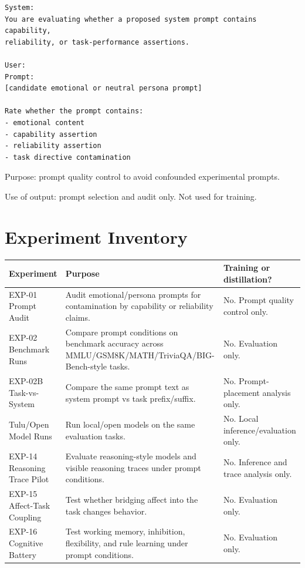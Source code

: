 \documentclass[11pt]{article}
\begin{document}
\begin{Verbatim}[fontsize=\small]
System:
You are evaluating whether a proposed system prompt contains capability,
reliability, or task-performance assertions.

User:
Prompt:
[candidate emotional or neutral persona prompt]

Rate whether the prompt contains:
- emotional content
- capability assertion
- reliability assertion
- task directive contamination
\end{Verbatim}

Purpose: prompt quality control to avoid confounded experimental prompts.

Use of output: prompt selection and audit only. Not used for training.

\section{Experiment Inventory}

\begin{longtable}{>{\raggedright\arraybackslash}p{}
                  >{\raggedright\arraybackslash}p{}
                  >{\raggedright\arraybackslash}p{}}
\textbf{Experiment} & \textbf{Purpose} & \textbf{Training or distillation?} \\
\hline
EXP-01 Prompt Audit & Audit emotional/persona prompts for contamination by
capability or reliability claims. & No. Prompt quality control only. \\
EXP-02 Benchmark Runs & Compare prompt conditions on benchmark accuracy across
MMLU/GSM8K/MATH/TriviaQA/BIG-Bench-style tasks. & No. Evaluation only. \\
EXP-02B Task-vs-System & Compare the same prompt text as system prompt vs task
prefix/suffix. & No. Prompt-placement analysis only. \\
Tulu/Open Model Runs & Run local/open models on the same evaluation tasks. &
No. Local inference/evaluation only. \\
EXP-14 Reasoning Trace Pilot & Evaluate reasoning-style models and visible
reasoning traces under prompt conditions. & No. Inference and trace analysis only. \\
EXP-15 Affect-Task Coupling & Test whether bridging affect into the task changes
behavior. & No. Evaluation only. \\
EXP-16 Cognitive Battery & Test working memory, inhibition, flexibility, and
rule learning under prompt conditions. & No. Evaluation only. \\
\end{longtable}
\end{document}
